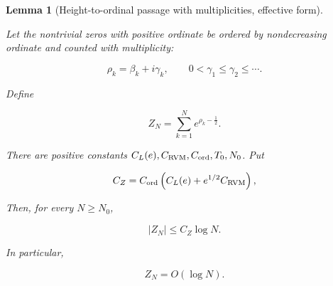 \documentclass[11pt]{amsart}
\numberwithin{equation}{section}
\theoremstyle{plain}
\newtheorem{lemma}[theorem]{Lemma}
\theoremstyle{definition}
\theoremstyle{remark}
\begin{document}
\begin{lemma}[Height-to-ordinal passage with multiplicities, effective form]
\label{prop:height_to_ordinal_with_multiplicities}
\label{thm:ZN_log_bound}

Let the nontrivial zeros with positive ordinate be ordered by
nondecreasing ordinate and counted with multiplicity:

\begin{equation}
\rho_k=\beta_k+i\gamma_k,
\qquad
0<\gamma_1\le\gamma_2\le\cdots.
\end{equation}

Define

\begin{equation}
Z_N
=
\sum_{k=1}^{N}e^{\rho_k-\frac12}.
\end{equation}

There are positive constants
\(C_L(e),C_{\rm RVM},C_{\rm ord},T_0,N_0\). Put

\begin{equation}
C_Z
=
C_{\rm ord}\left(C_L(e)+e^{1/2}C_{\rm RVM}\right),
\label{eq:CZ_constant_definition}
\end{equation}

Then, for every \(N\ge N_0\),

\begin{equation}
|Z_N|\le C_Z\log N.
\label{eq:ZN_log_bound_quantitative}
\end{equation}

In particular,

\begin{equation}
Z_N
=
O(\log N).
\label{eq:ZN_log_bound_result}
\end{equation}

\end{lemma}
\end{document}

